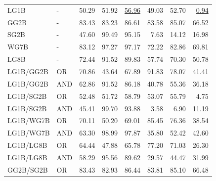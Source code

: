 \documentclass{article}
\begin{document}
{\begin{longtable}{llrrrrrr}
LG1B                     & -       & 50.29             & 51.92             & \underline{56.96} & 49.03            & 52.70            & \underline{0.94} \\
 GG2B                     & -       & 83.43             & 83.23             & 86.61             & 83.58            & 85.07            & 66.52            \\
 SG2B                     & -       & 47.60             & 99.49             & 95.15             & 7.63             & 14.12            & 16.98            \\
 WG7B                     & -       & 83.12             & 97.27             & 97.17             & 72.22            & 82.86            & 69.81            \\
 LG8B                     & -       & 72.44             & 91.52             & 89.83             & 57.74            & 70.30            & 50.78            \\
 LG1B/GG2B                & OR      & 70.86             & 43.64             & 67.89             & 91.83            & 78.07            & 41.41            \\
 LG1B/GG2B                & AND     & 62.86             & 91.52             & 86.18             & 40.78            & 55.36            & 36.18            \\
 LG1B/SG2B                & OR      & 52.48             & 51.72             & 58.79             & 53.07            & 55.79            & 4.75             \\
 LG1B/SG2B                & AND     & 45.41             & 99.70             & 93.88             & 3.58             & 6.90             & 11.19            \\
 LG1B/WG7B                & OR      & 70.11             & 50.20             & 69.01             & 85.45            & 76.36            & 38.54            \\
 LG1B/WG7B                & AND     & 63.30             & 98.99             & 97.87             & 35.80            & 52.42            & 42.60            \\
 LG1B/LG8B                & OR      & 64.44             & 47.88             & 65.78             & 77.20            & 71.03            & 26.30            \\
 LG1B/LG8B                & AND     & 58.29             & 95.56             & 89.62             & 29.57            & 44.47            & 31.99            \\
 GG2B/SG2B                & OR      & 83.43             & 82.93             & 86.44             & 83.81            & 85.10            & 66.48            \\

\end{longtable}}
\end{document}

